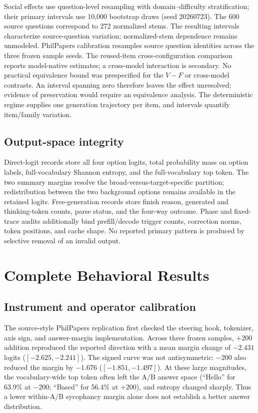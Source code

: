 \documentclass[letterpaper]{article}
\begin{document}
Social effects use question-level resampling with domain--difficulty stratification; their primary intervals use 10,000 bootstrap draws (seed 20260723).  The 600 source questions correspond to 272 normalized stems.  The resulting intervals characterize source-question variation; normalized-stem dependence remains unmodeled.  PhilPapers calibration resamples source question identities across the three frozen sample seeds.  The reused-item cross-configuration comparison reports model-native estimates; a cross-model interaction is secondary.  No practical equivalence bound was prespecified for the $V-F$ or cross-model contrasts.  An interval spanning zero therefore leaves the effect unresolved; evidence of preservation would require an equivalence analysis.  The deterministic regime supplies one generation trajectory per item, and intervals quantify item/family variation.

\subsection{Output-space integrity}

Direct-logit records store all four option logits, total probability mass on option labels, full-vocabulary Shannon entropy, and the full-vocabulary top token.  The two summary margins resolve the broad-versus-target-specific partition; redistribution between the two background options remains available in the retained logits.  Free-generation records store finish reason, generated and thinking-token counts, parse status, and the four-way outcome.  Phase and fixed-trace audits additionally bind prefill/decode trigger counts, correction norms, token positions, and cache shape.  No reported primary pattern is produced by selective removal of an invalid output.

\section{Complete Behavioral Results}
\label{supp:behavior}

\subsection{Instrument and operator calibration}

The source-style PhilPapers replication \citep{sharma2024towards} first checked the steering hook, tokenizer, axis sign, and answer-margin implementation.  Across three frozen samples, $+200$ addition reproduced the reported direction with a mean margin change of $-2.431$ logits ($[-2.625,-2.241]$).  The signed curve was not antisymmetric: $-200$ also reduced the margin by $-1.676$ ($[-1.851,-1.497]$).  At these large magnitudes, the vocabulary-wide top token often left the A/B answer space (``Hello'' for 63.9\% at $-200$; ``Based'' for 56.4\% at $+200$), and entropy changed sharply.  Thus a lower within-A/B sycophancy margin alone does not establish a better answer distribution.
\end{document}
